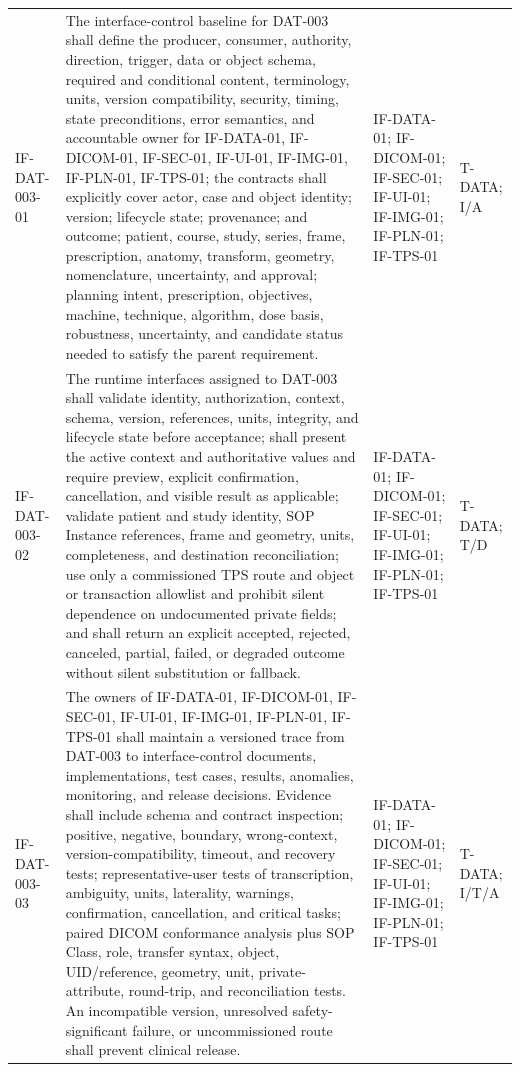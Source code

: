 \documentclass[11pt,letterpaper]{article}
\begin{document}
\begin{scriptsize}
\begin{longtable}{@{}L{0.14\textwidth}L{0.49\textwidth}L{0.19\textwidth}L{0.10\textwidth}@{}}
\mbox{IF-DAT-003-01} & The interface-control baseline for DAT-003 shall define the producer, consumer, authority, direction, trigger, data or object schema, required and conditional content, terminology, units, version compatibility, security, timing, state preconditions, error semantics, and accountable owner for IF-DATA-01, IF-DICOM-01, IF-SEC-01, IF-UI-01, IF-IMG-01, IF-PLN-01, IF-TPS-01; the contracts shall explicitly cover actor, case and object identity; version; lifecycle state; provenance; and outcome; patient, course, study, series, frame, prescription, anatomy, transform, geometry, nomenclature, uncertainty, and approval; planning intent, prescription, objectives, machine, technique, algorithm, dose basis, robustness, uncertainty, and candidate status needed to satisfy the parent requirement. & IF-DATA-01; IF-DICOM-01; IF-SEC-01; IF-UI-01; IF-IMG-01; IF-PLN-01; IF-TPS-01 & T-DATA; I\slash\allowbreak{}A \\
\addlinespace[2pt]
\mbox{IF-DAT-003-02} & The runtime interfaces assigned to DAT-003 shall validate identity, authorization, context, schema, version, references, units, integrity, and lifecycle state before acceptance; shall present the active context and authoritative values and require preview, explicit confirmation, cancellation, and visible result as applicable; validate patient and study identity, SOP Instance references, frame and geometry, units, completeness, and destination reconciliation; use only a commissioned TPS route and object or transaction allowlist and prohibit silent dependence on undocumented private fields; and shall return an explicit accepted, rejected, canceled, partial, failed, or degraded outcome without silent substitution or fallback. & IF-DATA-01; IF-DICOM-01; IF-SEC-01; IF-UI-01; IF-IMG-01; IF-PLN-01; IF-TPS-01 & T-DATA; T\slash\allowbreak{}D \\
\addlinespace[2pt]
\mbox{IF-DAT-003-03} & The owners of IF-DATA-01, IF-DICOM-01, IF-SEC-01, IF-UI-01, IF-IMG-01, IF-PLN-01, IF-TPS-01 shall maintain a versioned trace from DAT-003 to interface-control documents, implementations, test cases, results, anomalies, monitoring, and release decisions. Evidence shall include schema and contract inspection; positive, negative, boundary, wrong-context, version-compatibility, timeout, and recovery tests; representative-user tests of transcription, ambiguity, units, laterality, warnings, confirmation, cancellation, and critical tasks; paired DICOM conformance analysis plus SOP Class, role, transfer syntax, object, UID\slash\allowbreak{}reference, geometry, unit, private-attribute, round-trip, and reconciliation tests. An incompatible version, unresolved safety-significant failure, or uncommissioned route shall prevent clinical release. & IF-DATA-01; IF-DICOM-01; IF-SEC-01; IF-UI-01; IF-IMG-01; IF-PLN-01; IF-TPS-01 & T-DATA; I\slash\allowbreak{}T\slash\allowbreak{}A \\

\end{longtable}
\end{scriptsize}
\end{document}
